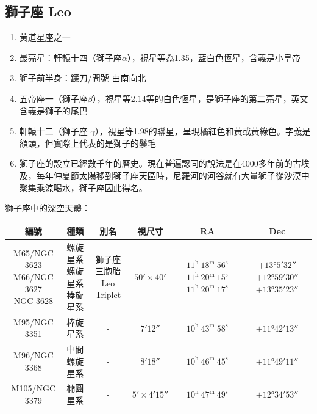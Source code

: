 \subsection{獅子座 Leo}
\begin{enumerate}
    \item 黃道星座之一
    \item 最亮星：軒轅十四（獅子座\(\alpha\)），視星等為1.35，藍白色恆星，含義是小皇帝
    \item 獅子前半身：鐮刀/問號 由南向北
    \item 五帝座一（獅子座\(\beta\)），視星等2.14等的白色恆星，是獅子座的第二亮星，英文含義是獅子的尾巴
    \item 軒轅十二（獅子座 \(\gamma\)），視星等1.98的聯星，呈現橘紅色和黃或黃綠色。字義是額頭，但實際上代表的是獅子的鬃毛
    \item 獅子座的設立已經數千年的曆史。現在普遍認同的說法是在4000多年前的古埃及，每年仲夏節太陽移到獅子座天區時，尼羅河的河谷就有大量獅子從沙漠中聚集乘涼喝水，獅子座因此得名。
\end{enumerate}
獅子座中的深空天體：

\begin{center}
\begin{longtable}{c | c | c | c | c | c}
    編號 & 種類 & 別名 & 視尺寸 & RA & Dec \\
    \hline
    \endfirsthead


    \endfoot

    \endlastfoot

    \makecell{M65/NGC 3623\\M66/NGC 3627\\NGC 3628} & \makecell{螺旋星系\\螺旋星系\\棒旋星系} & \makecell{獅子座三胞胎\\Leo Triplet} & \(\ang{;50;}\times\ang{;40;}\) & \makecell{\(11^\text{h }18^\text{m }56^\text{s}\)\\\(11^\text{h }20^\text{m }15^\text{s}\)\\\(11^\text{h }20^\text{m }17^\text{s}\)} & \makecell{\(+\ang{13;5;32}\)\\\(+\ang{12;59;30}\)\\\(+\ang{13;35;23}\)} \\  
    M95/NGC 3351 & 棒旋星系 & - & \(\ang{;7;12}\) & \(10^\text{h }43^\text{m }58^\text{s}\) & \(+\ang{11;42;13}\) \\
    M96/NGC 3368 & 中間螺旋星系 & - & \(\ang{;8;18}\) & \(10^\text{h }46^\text{m }45^\text{s}\) & \(+\ang{11;49;11}\) \\
    M105/NGC 3379 & 橢圓星系 & - & \(\ang{;5;}\times\ang{;4;15}\) & \(10^\text{h }47^\text{m }49^\text{s}\) & \(+\ang{12;34;53}\) \\
\end{longtable}
\end{center}

